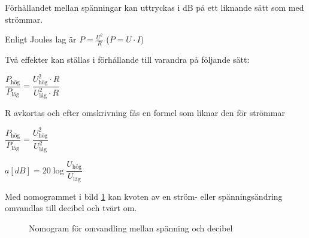 Förhållandet mellan spänningar kan uttryckas i dB på ett liknande sätt som med
strömmar.

Enligt Joules lag är \(P = \frac{U^2}{R}\) (\(P = U \cdot I\))

Två effekter kan ställas i förhållande till varandra på följande sätt:

\(\dfrac{P_\text{hög}}{P_\text{låg}}=\dfrac{U_\text{hög}^2 \cdot R}{U_\text{låg}^2 \cdot R}\)

R avkortas och efter omskrivning fås en formel som liknar den för strömmar

\(\dfrac{P_\text{hög}}{P_\text{låg}} = \dfrac{U_\text{hög}^2}{U_\text{låg}^2}\)

\(a[dB] = 20\log \dfrac{U_\text{hög}}{U_\text{låg}}\)

Med nomogrammet i bild \ref{ellära-nomogram-db-spänning} kan kvoten av en ström- eller spänningsändring omvandlas
till decibel och tvärt om.

\begin{figure}
  \caption{Nomogram för omvandling mellan spänning och decibel}
  \label{ellära-nomogram-db-spänning}
\end{figure}

